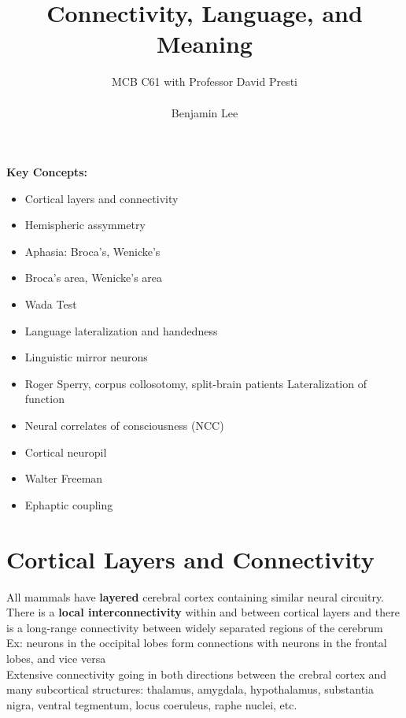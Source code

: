 \documentclass{article}
\title{Connectivity, Language, and Meaning}
\author{MCB C61 with Professor David Presti \\ \\ Benjamin Lee}
\begin{document}
\maketitle

\textbf{Key Concepts:}
\begin{itemize}
    \item Cortical layers and connectivity
    \item Hemispheric assymmetry
    \item Aphasia: Broca's, Wenicke's
    \item Broca's area, Wenicke's area 
    \item Wada Test
    \item Language lateralization and handedness
    \item Linguistic mirror neurons
    \item Roger Sperry, corpus collosotomy, split-brain patients
    \itm Lateralization of function
    \item Neural correlates of consciousness (NCC) 
    \item Cortical neuropil 
    \item Walter Freeman
    \item Ephaptic coupling
\end{itemize}

\newpage

\section{Cortical Layers and Connectivity}
All mammals have \textbf{layered} cerebral cortex containing similar neural circuitry. \\
There is a \textbf{local interconnectivity} within and between cortical layers and there is a long-range connectivity between widely separated regions of the cerebrum \\

\noindent Ex: neurons in the occipital lobes form connections with neurons in the frontal lobes, and vice versa \\

\noindent Extensive connectivity going in both directions between the crebral cortex and many subcortical structures: thalamus, amygdala, hypothalamus, substantia nigra, ventral tegmentum, locus coeruleus, raphe nuclei, etc. \\
\end{document}
